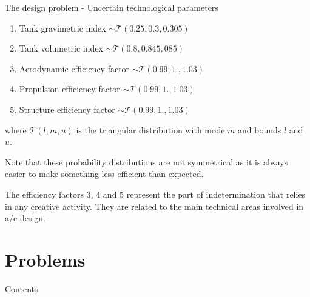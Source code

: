\documentclass[aspectratio=169]{beamer}
\begin{document}
\begin{frame}{The design problem - Uncertain technological parameters}
    \begin{enumerate}
        \item Tank gravimetric index $\sim\mathcal{T}(0.25, 0.3, 0.305)$
        \item Tank volumetric index $\sim\mathcal{T}(0.8, 0.845, 085)$
        \item Aerodynamic efficiency factor $\sim\mathcal{T}(0.99, 1., 1.03)$
        \item Propulsion efficiency factor $\sim\mathcal{T}(0.99, 1., 1.03)$
        \item Structure efficiency factor $\sim\mathcal{T}(0.99, 1., 1.03)$
    \end{enumerate}
    where $\mathcal{T}(l,m,u)$ is the triangular distribution with mode $m$ and bounds $l$ and $u$.

    Note that these probability distributions are not symmetrical as it is always easier to make something less efficient than expected.

    The efficiency factors 3, 4 and 5 represent the part of indetermination that relies in any creative activity.
    They are related to the main technical areas involved in a/c design.
\end{frame}

\section{Problems}\label{sec:problems}

\begin{frame}{Contents}
    \tableofcontents[currentsection]
\end{frame}
\end{document}
